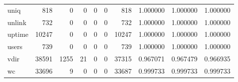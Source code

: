 \begin{longtable}{lrrrrrrrrr}
uniq      &                                                818 &                                                  0 &                                                  0 &                                                  0 &                                                  0 &                                                818 &                                           1.000000 &                               1.000000 &                             1.000000 \\
unlink    &                                                732 &                                                  0 &                                                  0 &                                                  0 &                                                  0 &                                                732 &                                           1.000000 &                               1.000000 &                             1.000000 \\
uptime    &                                              10247 &                                                  0 &                                                  0 &                                                  0 &                                                  0 &                                              10247 &                                           1.000000 &                               1.000000 &                             1.000000 \\
users     &                                                739 &                                                  0 &                                                  0 &                                                  0 &                                                  0 &                                                739 &                                           1.000000 &                               1.000000 &                             1.000000 \\
vdir      &                                              38591 &                                               1255 &                                                 21 &                                                  0 &                                                  0 &                                              37315 &                                           0.967071 &                               0.967479 &                             0.966935 \\
wc        &                                              33696 &                                                  9 &                                                  0 &                                                  0 &                                                  0 &                                              33687 &                                           0.999733 &                               0.999733 &                             0.999733 \\

\end{longtable}
